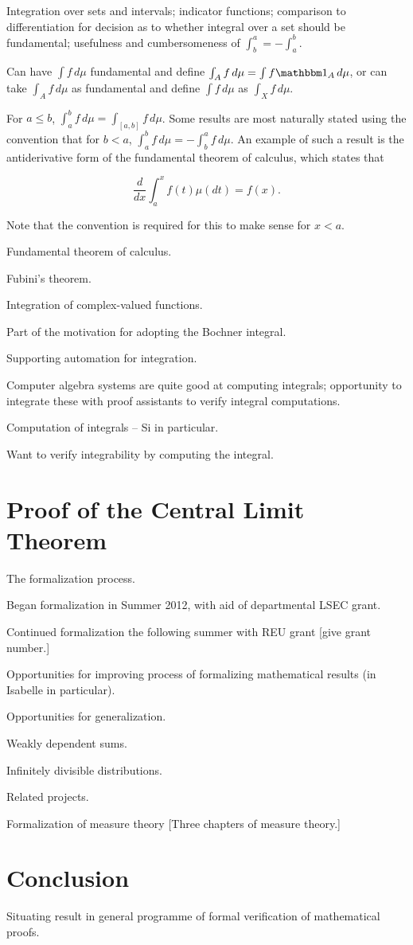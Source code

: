 \documentclass{amsart}
\theoremstyle{definition}
\theoremstyle{remark}
\begin{document}
Integration over sets and intervals; indicator functions; comparison to differentiation for decision as to whether integral over a set should be fundamental; usefulness and cumbersomeness of $\int_b^a = - \int_a^b$.

Can have $\int f \, d\mu$ fundamental and define $\int_A f \, d\mu = \int f \mathbbm 1_A \, d\mu$, or can take $\int_A f \, d\mu$ as fundamental and define $\int f \, d\mu$ as $\int_X f \, d\mu$.

For $a \le b$, $\int_a^b f \, d\mu = \int_{[a,b]} f \, d\mu$. Some results are most naturally stated using the convention that for $b < a$, $\int_a^b f \, d\mu = - \int_b^a f \, d\mu$. An example of such a result is the antiderivative form of the fundamental theorem of calculus, which states that

\[ \frac{d}{dx} \int_a^x f(t) \mu(dt) = f(x). \]

Note that the convention is required for this to make sense for $x < a$.

Fundamental theorem of calculus.

Fubini's theorem.

Integration of complex-valued functions.

Part of the motivation for adopting the Bochner integral.

Supporting automation for integration.

Computer algebra systems are quite good at computing integrals; opportunity to integrate these with proof assistants to verify integral computations.

Computation of integrals -- Si in particular.

Want to verify integrability by computing the integral.

\section{Proof of the Central Limit Theorem} \label{Proof}

The formalization process.

Began formalization in Summer 2012, with aid of departmental LSEC grant.

Continued formalization the following summer with REU grant [give grant number.]

Opportunities for improving process of formalizing mathematical results (in Isabelle in particular).

Opportunities for generalization.

Weakly dependent sums.

Infinitely divisible distributions.

Related projects.

Formalization of measure theory [Three chapters of measure theory.]

\section{Conclusion} \label{End}

Situating result in general programme of formal verification of mathematical proofs.



\end{document}
